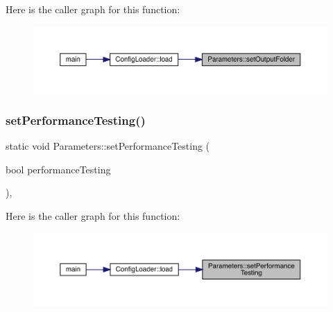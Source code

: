 Here is the caller graph for this function\+:
\nopagebreak
\begin{figure}[H]
\begin{center}
\leavevmode
\includegraphics[width=350pt]{class_parameters_a58dff6fbcc88bb916b9590057bf338ff_icgraph}
\end{center}
\end{figure}
\mbox{\label{class_parameters_a0b9d1947d6a3a016ed196d97b548730d}} 
\subsubsection{\texorpdfstring{setPerformanceTesting()}{setPerformanceTesting()}}
{\footnotesize\ttfamily static void Parameters\+::set\+Performance\+Testing (\begin{DoxyParamCaption}\item[{bool}]{performance\+Testing }\end{DoxyParamCaption})\hspace{0.3cm}{\ttfamily [inline]}, {\ttfamily [static]}}

Here is the caller graph for this function\+:
\nopagebreak
\begin{figure}[H]
\begin{center}
\leavevmode
\includegraphics[width=350pt]{class_parameters_a0b9d1947d6a3a016ed196d97b548730d_icgraph}
\end{center}
\end{figure}
\mbox{\label{class_parameters_a4c983b1ab17ec51be118792b3a6d17a5}} 
